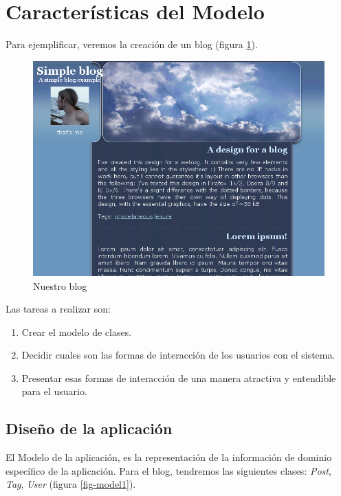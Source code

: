 \section{Características del Modelo}

Para ejemplificar, veremos la creación de un blog (figura \ref{fig-blog1}).

\begin{figure}[h]
	\centering
	\includegraphics[scale=0.6]{images/blog1.png}
 	\caption{Nuestro blog}
 	\label{fig-blog1}
\end{figure}

Las tareas a realizar son:
\begin{enumerate}
\item Crear el modelo de clases.
\item Decidir cuales son las formas de interacción de los usuarios con el sistema.
\item Presentar esas formas de interacción de una manera atractiva y entendible para el usuario.
\end{enumerate}

\subsection{Diseño de la aplicación}

El Modelo de la aplicación, es la representación de la información de dominio específico de la aplicación. Para el blog, tendremos las siguientes clases: \emph{Post}, \emph{Tag}, \emph{User} (figura \ref{fig-model1}).

